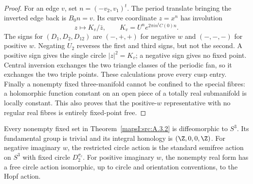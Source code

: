 \begin{proof}
For an edge $v$, set $n=(-v_2,v_1)^t$. The period translate bringing
the inverted edge back is $B_0n=v$. Its curve coordinate $z=x^n$ has
involution
\[
 z\longmapsto K_v/\bar z,
 \qquad K_v=U^n e^{2\pi i n^tC(0)n}.
 \label{mapsI:real-eq-8}
\]
The signs for $(D_1,D_2,D_{12})$ are $(-,+,+)$ for negative $w$
and $(-,-,-)$ for positive $w$. Negating $U_2$ reverses the first and
third signs, but not the second. A positive sign gives the single
circle $|z|^2=K_v$; a negative sign gives no fixed point. Central
inversion exchanges the two triangle classes of the periodic fan, so
it exchanges the two triple points. These calculations prove every
cusp entry. Finally a nonempty fixed three-manifold cannot be confined
to the special fibres: a holomorphic function constant on an open
piece of a totally real submanifold is locally constant. This also
proves that the positive-$w$ representative with no regular real
fibres is entirely fixed-point free.
\end{proof}

\begin{theorem}\label{mapsI:src:A.3.3}
Every nonempty fixed set in Theorem~\ref{mapsI:src:A.3.2} is diffeomorphic to $S^3$.
Its fundamental group is trivial and its integral homology is
$(\Z,0,0,\Z)$. For negative imaginary $w$, the restricted circle action
is the standard semifree action on $S^3$ with fixed circle
$D_2^{\sigma_c}$. For positive imaginary $w$, the nonempty real form
has a free circle action isomorphic, up to circle and orientation
conventions, to the Hopf action.
\end{theorem}

